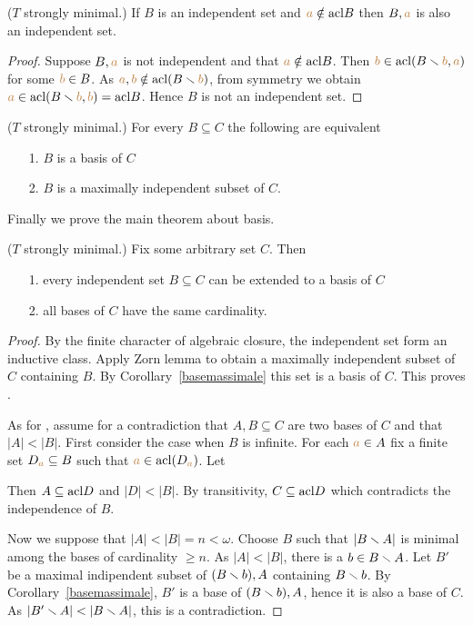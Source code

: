 \begin{lemma}\label{indipendenza+1}
($T$ strongly minimal.) If $B$ is an independent set and ${\color{brown} a}\notin {\rm acl} B$ then $B,{\color{brown} a}$ is also an independent set.
\end{lemma}
\begin{proof}
Suppose $B,{\color{brown} a}$ is not independent and that ${\color{brown} a}\notin {\rm acl} B$.
Then ${\color{brown} b}\in{\rm acl}(B\smallsetminus {\color{brown}b},{\color{brown} a})$ for some ${\color{brown} b}\in B$.
As ${\color{brown} a},{\color{brown} b}\notin{\rm acl}(B\smallsetminus {\color{brown}b})$, from symmetry we obtain ${\color{brown} a}\in{\rm acl}(B\smallsetminus {\color{brown}b},{\color{brown} b})={\rm acl} B$.
Hence $B$ is not an independent set.
\end{proof}

\begin{corollary}\label{basemassimale}
($T$ strongly minimal.) For every $B\subseteq C$ the following are equivalent
\begin{itemize}
\item[1.] $B$ is a basis of $C$
\item[2.] $B$ is a maximally independent subset of $C$.
\end{itemize}
\end{corollary}

Finally we prove the main theorem about basis.

\begin{theorem} ($T$ strongly minimal.) Fix some arbitrary set $C$. Then
  \begin{itemize}
  \item[1.] every independent set $B\subseteq C$ can be extended to a basis of $C$
  \item[2.] all bases of $C$ have the same cardinality.
  \end{itemize}
\end{theorem}

\begin{proof}
  By the finite character of algebraic closure, the independent set form an inductive class.
  Apply Zorn lemma to obtain a maximally independent subset of $C$ containing $B$.
  By Corollary~\ref{basemassimale} this set is a basis of $C$.
  This proves .

  As for , assume for a contradiction that $A,B\subseteq C$ are two bases of $C$ and that $|A|<|B|$.
  First consider the case when $B$ is infinite.
  For each ${\color{brown} a}\in A$ fix a finite set $D_{\color{brown} a}\subseteq B$ such that ${\color{brown} a}\in{\rm acl}(D_{\color{brown} a})$.
  Let


  Then $A\subseteq{\rm acl} D$ and $|D|<|B|$.
  By transitivity, $C\subseteq{\rm acl} D$ which contradicts the independence of $B$.

  Now we suppose that $|A|<|B|=n<\omega$.
  Choose $B$ such that $|B\smallsetminus A|$ is minimal among the bases of cardinality $\ge n$.
  As $|A|<|B|$, there is a $b\in B\smallsetminus A$.
  Let $B'$ be a maximal indipendent subset of $(B\smallsetminus b),A$ containing $B\smallsetminus b$.
  By Corollary~\ref{basemassimale}, $B'$ is a base of $(B\smallsetminus b),A$, hence it is also a base of $C$.
  As $|B'\sm A|<|B\sm A|$, this is a contradiction.
\end{proof}

